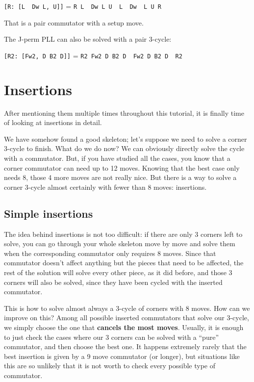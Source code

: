 \documentclass[11pt,a4paper]{book}
\newcommand{\p}{\textquotesingle}
\newcommand{\m}{\texttt}
\newcommand{\ps}{\p\,\,}
\begin{document}
\begin{center}
\m{[R: [L\ps Dw L, U\p]]} = \m{R L\ps Dw L U\ps L\ps Dw\ps L U R\p}
\end{center}

That is a pair commutator with a setup move.

The J-perm PLL can also be solved with a pair 3-cycle:

\begin{center}
\m{[R2: [Fw2, D B2 D\p]]} = \m{R2 Fw2 D B2 D\ps Fw2 D B2 D\ps R2}
\end{center}

\section{Insertions}

After mentioning them multiple times throughout this tutorial, it is finally time of looking at insertions in detail.

We have somehow found a good skeleton; let's suppose we need to solve a corner 3-cycle to finish. What do we do now? We can obviously directly solve the cycle with a commutator. But, if you have studied all the cases, you know that a corner commutator can need up to 12 moves. Knowing that the best case only needs 8, those 4 more moves are not really nice. But there is a way to solve a corner 3-cycle almost certainly with fewer than 8 moves: insertions.

\subsection{Simple insertions}

The idea behind insertions is not too difficult: if there are only 3 corners left to solve, you can go through your whole skeleton move by move and solve them when the corresponding commutator only requires 8 moves. Since that commutator doesn't affect anything but the pieces that need to be affected, the rest of the solution will solve every other piece, as it did before, and those 3 corners will also be solved, since they have been cycled with the inserted commutator.

This is how to solve almost always a 3-cycle of corners with 8 moves. How can we improve on this? Among all possible inserted commutators that solve our 3-cycle, we simply choose the one that \textbf{cancels the most moves}. Usually, it is enough to just check the cases where our 3 corners can be solved with a ``pure'' commutator, and then choose the best one. It happens extremely rarely that the best insertion is given by a 9 move commutator (or longer), but situations like this are so unlikely that it is not worth to check every possible type of commutator.
\end{document}
